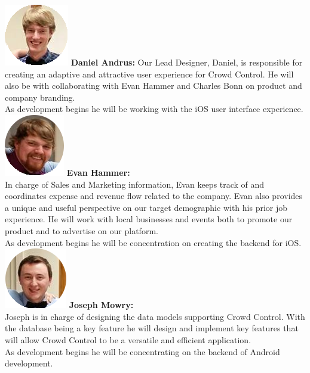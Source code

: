 \noindent
\includegraphics{danielandrus}
\textbf{Daniel Andrus:} Our Lead Designer, Daniel, is responsible for creating an adaptive and attractive user experience for Crowd Control. He will also be with collaborating with Evan Hammer and Charles Bonn on product and company branding.\\
 As development begins he will be working with the iOS user interface experience.\\
 
\noindent
\includegraphics{evanhammer}
\textbf{Evan Hammer:}\\ In charge of Sales and Marketing information, Evan keeps track of and coordinates expense and revenue flow related to the company. Evan also provides a unique and useful perspective on our target demographic with his prior job experience. He will work with local businesses and events both to promote our product and to advertise on our platform.\\
 As development begins he will be concentration on creating the backend for iOS. \\
 
\noindent
\includegraphics{joemowry}
\textbf{Joseph Mowry:}\\ Joseph is in charge of designing the data models supporting Crowd Control. With the database being a key feature he will design and implement key features that will allow Crowd Control to be a versatile and efficient application.\\
 As development begins he will be concentrating on the backend of Android development.\\

